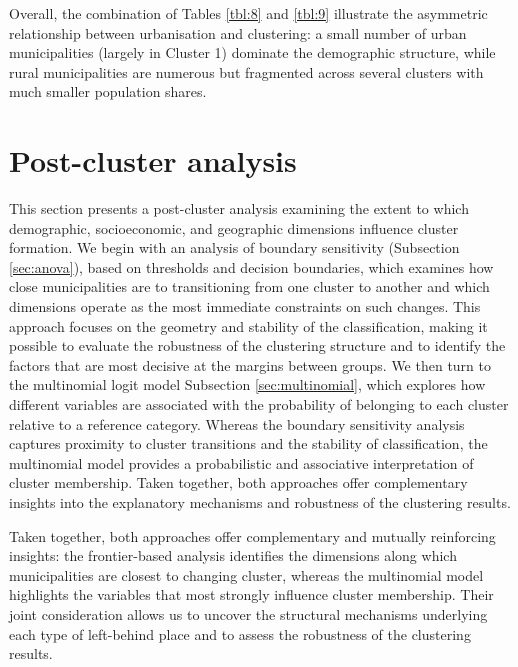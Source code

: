 \documentclass[a4paper,11pt,oneside]{article}
\begin{document}
Overall, the combination of Tables \ref{tbl:8} and \ref{tbl:9} illustrate the asymmetric relationship between urbanisation and clustering: a small number of urban municipalities (largely in Cluster 1) dominate the demographic structure, while rural municipalities are numerous but fragmented across several clusters with much smaller population shares.





\section{Post-cluster analysis}
\label{sec:post_cluster}
This section presents a post-cluster analysis examining the extent to which demographic, socioeconomic, and geographic dimensions influence cluster formation. We begin with an analysis of boundary sensitivity (Subsection \ref{sec:anova}), based on thresholds and decision boundaries, which examines how close municipalities are to transitioning from one cluster to another and which dimensions operate as the most immediate constraints on such changes. This approach focuses on the geometry and stability of the classification, making it possible to evaluate the robustness of the clustering structure and to identify the factors that are most decisive at the margins between groups. We then turn to the multinomial logit model Subsection \ref{sec:multinomial}, which explores how different variables are associated with the probability of belonging to each cluster relative to a reference category. Whereas the boundary sensitivity analysis captures proximity to cluster transitions and the stability of classification, the multinomial model provides a probabilistic and associative interpretation of cluster membership. Taken together, both approaches offer complementary insights into the explanatory mechanisms and robustness of the clustering results.

Taken together, both approaches offer complementary and mutually reinforcing insights: the frontier-based analysis identifies the dimensions along which municipalities are closest to changing cluster, whereas the multinomial model highlights the variables that most strongly influence cluster membership. Their joint consideration allows us to uncover the structural mechanisms underlying each type of left-behind place and to assess the robustness of the clustering results.
\end{document}
